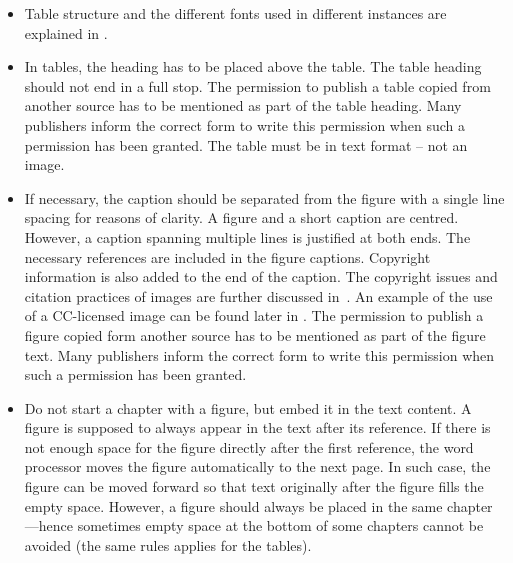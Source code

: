 \begin{itemize}
    \setlength\itemsep{0pt}
    \setlength\parskip{0pt}
    \item Table structure and the different fonts used in different instances are explained in
    .
    \item In tables, the heading has to be placed above the table. The table heading should
    not end in a full stop. The permission to publish a table copied from another
    source has to be mentioned as part of the table heading. Many publishers inform
    the correct form to write this permission when such a permission has been
    granted. The table must be in text format – not an image.
    \item If necessary, the caption should be separated from the figure with a single line spacing for reasons of clarity. A figure and a short caption are centred. However, a caption spanning multiple
    lines is justified at both ends. The necessary references are included in the figure captions. Copyright information is
    also added to the end of the caption. The copyright issues and citation practices of images
    are further discussed in~. An example of the use of a CC-licensed image can
    be found later in . The permission to
    publish a figure copied form another source has to be mentioned as part of the
    figure text. Many publishers inform the correct form to write this permission
    when such a permission has been granted.
    \item Do not start a chapter with a figure, but embed it in the text content. A figure is
    supposed to always appear in the text after its reference. If there is not enough
    space for the figure directly after the first reference, the word processor moves the
    figure automatically to the next page. In such case, the figure can be moved 
    forward so that text originally after the figure fills the empty space. However, a
    figure should always be placed in the same chapter---hence sometimes empty
    space at the bottom of some chapters cannot be avoided (the same rules applies for the
    tables).
\end{itemize}


